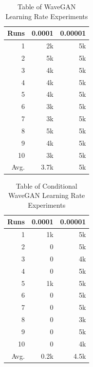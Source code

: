 \documentclass[a4paper, titlepage]{article}
\begin{document}
\begin{appendices}
\begin{table}[ht]
    \caption{Table of WaveGAN Learning Rate Experiments}
    \label{tab:WGAN_LR}
    
    \begin{center}
      \begin{tabular}{ r | r | r }
        
        Runs & 0.0001 & 0.00001 \\
        \hline
        1 & 2k & 5k \\
        2 & 5k & 5k \\
        3 & 4k & 5k \\
        4 & 4k & 5k \\
        5 & 4k & 5k \\
        6 & 3k & 5k \\
        7 & 3k & 5k \\
        8 & 5k & 5k \\
        9 & 4k & 5k \\
        10 & 3k & 5k \\
        \hline
        Avg. & 3.7k & 5k \\
        
      \end{tabular}
    \end{center}
    
  \end{table}

  \begin{table}[ht]
    
    \caption{Table of Conditional WaveGAN Learning Rate Experiments}
    \label{tab:CWGAN_LR}
    
    \begin{center}
      \begin{tabular}{ r | r | r }
        
        Runs & 0.0001 & 0.00001 \\
        \hline
        1 & 1k & 5k \\
        2 & 0 & 5k \\
        3 & 0 & 4k \\
        4 & 0 & 5k \\
        5 & 1k & 5k \\
        6 & 0 & 5k \\
        7 & 0 & 5k \\
        8 & 0 & 3k \\
        9 & 0 & 5k \\
        10 & 0 & 4k \\
        \hline
        Avg. & 0.2k & 4.5k \\
        

\end{tabular}
\end{center}
\end{table}
\end{appendices}
\end{document}
